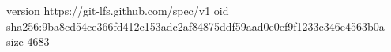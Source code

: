 version https://git-lfs.github.com/spec/v1
oid sha256:9ba8cd54ce366fd412c153adc2af84875ddf59aad0e0ef9f1233c346e4563b0a
size 4683
